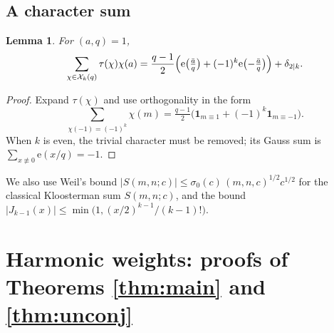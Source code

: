 \documentclass[11pt]{amsart}
\newtheorem{lemma}[theorem]{Lemma}
\theoremstyle{remark}
\newcommand{\e}{\mathrm{e}}
\newcommand{\cX}{\mathcal{X}}
\begin{document}
\subsection{A character sum}
\begin{lemma}\label{lem:charsum}
For $(a,q)=1$,
\[
\sum_{\chi\in\cX_k(q)}\tau(\chi)\chi(a)=\frac{q-1}{2}\Bigl(\e\bigl(\tfrac{\bar a}{q}\bigr)+(-1)^k\e\bigl(-\tfrac{\bar a}{q}\bigr)\Bigr)+\delta_{2\mid k}.
\]
\end{lemma}
\begin{proof}
Expand $\tau(\chi)$ and use orthogonality in the form
\[
\sum_{\chi(-1)=(-1)^k}\chi(m)=\tfrac{q-1}{2}\bigl(\mathbf 1_{m\equiv1}+(-1)^k\mathbf 1_{m\equiv-1}\bigr).
\] When $k$ is even, the trivial character must be removed; its Gauss sum is $\sum_{x\not\equiv0}\e(x/q)=-1$.
\end{proof}

We also use Weil's bound $|S(m,n;c)|\le\sigma_0(c)\,(m,n,c)^{1/2}c^{1/2}$ for the classical Kloosterman sum $S(m,n;c)$, and the bound $|J_{k-1}(x)|\le\min\bigl(1,(x/2)^{k-1}/(k-1)!\bigr)$.

\section{Harmonic weights: proofs of Theorems \ref{thm:main} and \ref{thm:unconj}}\label{sec:harmonic}
\end{document}
